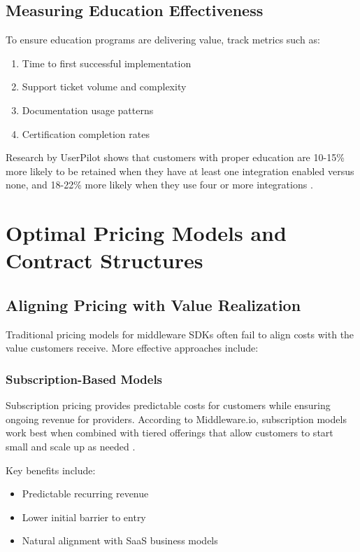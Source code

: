 \documentclass[11pt,a4paper]{article}
\begin{document}
\subsection{Measuring Education Effectiveness}

To ensure education programs are delivering value, track metrics such as:

\begin{enumerate}
    \item Time to first successful implementation
    \item Support ticket volume and complexity
    \item Documentation usage patterns
    \item Certification completion rates
\end{enumerate}

Research by UserPilot shows that customers with proper education are 10-15\% more likely to be retained when they have at least one integration enabled versus none, and 18-22\% more likely when they use four or more integrations \cite{userpilot2023}.

\section{Optimal Pricing Models and Contract Structures}

\subsection{Aligning Pricing with Value Realization}

Traditional pricing models for middleware SDKs often fail to align costs with the value customers receive. More effective approaches include:

\subsubsection{Subscription-Based Models}

Subscription pricing provides predictable costs for customers while ensuring ongoing revenue for providers. According to Middleware.io, subscription models work best when combined with tiered offerings that allow customers to start small and scale up as needed \cite{middleware2023}.

Key benefits include:
\begin{itemize}
    \item Predictable recurring revenue
    \item Lower initial barrier to entry
    \item Natural alignment with SaaS business models
\end{itemize}
\end{document}
